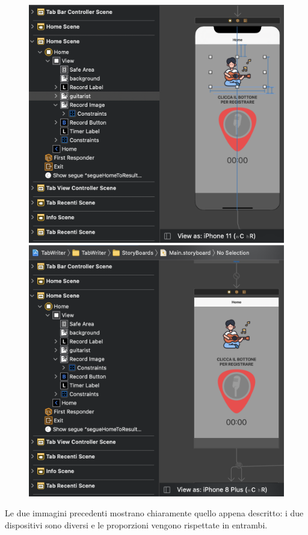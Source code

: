 \begin{figure}[H]
	\centering
	\includegraphics[scale=0.20]{./images/img2.png}
	\includegraphics[scale=0.20]{./images/img3.png}
\end{figure}
\noindent Le due immagini precedenti mostrano chiaramente quello appena descritto: i due dispositivi sono diversi e le proporzioni vengono rispettate in entrambi.\\
